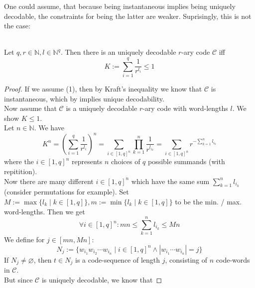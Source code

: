 \documentclass[12pt]{article}
\newenvironment{statement3}[3]{\begin{trivlist}
\item[\hskip \labelsep {\bfseries #1}\hskip \labelsep {\bfseries #2} {#3}\textbf{.}]}{\end{trivlist}}
\begin{document}
One could assume, that because being instantaneous implies being uniquely decodable, the constraints
for being the latter are weaker. Suprisingly, this is not the case:

\begin{statement3}{(1.8)}{Theorem}{(McMillan's Inequality)}\strut\\[2pt]
    Let $q,r \in \mathbb{N}, l \in \mathbb{N}^q$. Then there is an uniquely decodable
    $r$-ary code $\mathcal{C}$ iff
    \begin{equation}
        K := \sum_{i=1}^{q} \frac{1}{r^{l_i}} \leq 1 \tag{1}
    \end{equation}

    \begin{proof}
        If we assume (1), then by Kraft's inequality we know that $\mathcal{C}$
        is instantaneous, which by \cite{ICT} implies unique decodability.\\[10pt]
        Now assume that $\mathcal{C}$ is a uniquely decodable $r$-ary code with word-lengths
        $l$. We show $K \leq 1$. \\
        Let $n \in \mathbb{N}$. We have
        \begin{equation}
            K^n
            = \left(\sum_{i=1}^{q} \frac{1}{r^{l_i}}\right)^n
            = \sum_{i \in [1,q]^n}\prod_{k=1}^{n} \frac{1}{r^{l_{i_k}}}
            = \sum_{i \in [1,q]^n} r^{-\sum_{k=1}^{n} l_{i_k}} \tag{2}
        \end{equation}
        where the $i \in [1,q]^n$ represents $n$ choices of $q$ possible summands (with repitition).\\[10pt]
        Now there are many different $i \in [1,q]^n$ which have the same sum $\sum_{k=1}^{n} l_{i_k}$
        (consider permutations for example). Set $M := \max\{l_k\mid k \in [1,q]\}, m := \min\{l_k \mid k \in [1,q]\}$
        to be the min. / max. word-lengths.
        Then we get
        \begin{equation}
            \forall i \in [1,q]^n: mn \leq \sum_{k=1}^{n} l_{i_k} \leq Mn \tag{3}
        \end{equation}
        We define for
        $j \in [mn,Mn]$:
        $$
            N_{j} := \{w_{i_1}w_{i_2}\cdots w_{i_n} \mid i \in [1,q]^n \land |w_{i_1}\cdots w_{i_n}| = j \}
        $$
        If $N_j \neq \varnothing$, then $t \in N_{j}$ is a code-sequence of length $j$, consisting of $n$ code-words in $\mathcal{C}$.
        \\
        But since $\mathcal{C}$ is uniquely decodable, we know that

\end{proof}
\end{statement3}
\end{document}
